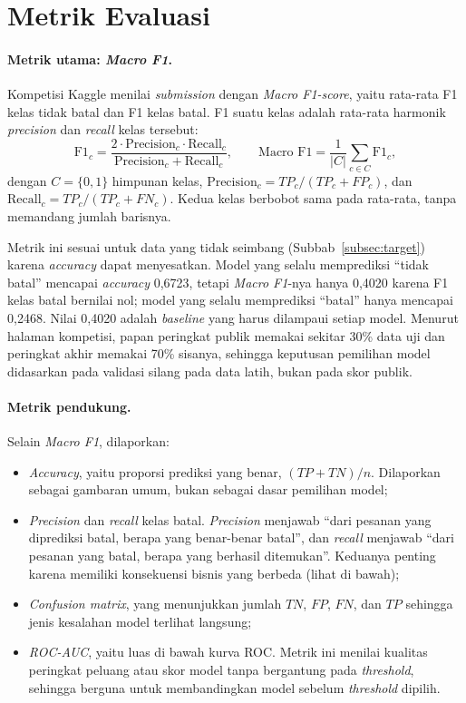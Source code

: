 \section{Metrik Evaluasi}
\label{sec:metrik}

\paragraph{Metrik utama: \textit{Macro F1}.} Kompetisi Kaggle menilai \textit{submission} dengan \textit{Macro F1-score}, yaitu rata-rata F1 kelas tidak batal dan F1 kelas batal. F1 suatu kelas adalah rata-rata harmonik \textit{precision} dan \textit{recall} kelas tersebut:
\begin{equation}
	\text{F1}_c = \frac{2 \cdot \text{Precision}_c \cdot \text{Recall}_c}{\text{Precision}_c + \text{Recall}_c},
	\qquad
	\text{Macro F1} = \frac{1}{|C|} \sum_{c \in C} \text{F1}_c,
	\label{eq:macro-f1}
\end{equation}
dengan $C = \{0, 1\}$ himpunan kelas, $\text{Precision}_c = TP_c / (TP_c + FP_c)$, dan $\text{Recall}_c = TP_c / (TP_c + FN_c)$. Kedua kelas berbobot sama pada rata-rata, tanpa memandang jumlah barisnya.

Metrik ini sesuai untuk data yang tidak seimbang (Subbab~\ref{subsec:target}) karena \textit{accuracy} dapat menyesatkan. Model yang selalu memprediksi ``tidak batal'' mencapai \textit{accuracy} 0,6723, tetapi \textit{Macro F1}-nya hanya 0,4020 karena F1 kelas batal bernilai nol; model yang selalu memprediksi ``batal'' hanya mencapai 0,2468. Nilai 0,4020 adalah \textit{baseline} yang harus dilampaui setiap model. Menurut halaman kompetisi, papan peringkat publik memakai sekitar 30\% data uji dan peringkat akhir memakai 70\% sisanya, sehingga keputusan pemilihan model didasarkan pada validasi silang pada data latih, bukan pada skor publik.

\paragraph{Metrik pendukung.} Selain \textit{Macro F1}, dilaporkan:
\begin{itemize}
	\item \textit{Accuracy}, yaitu proporsi prediksi yang benar, $(TP + TN) / n$. Dilaporkan sebagai gambaran umum, bukan sebagai dasar pemilihan model;
	\item \textit{Precision} dan \textit{recall} kelas batal. \textit{Precision} menjawab ``dari pesanan yang diprediksi batal, berapa yang benar-benar batal'', dan \textit{recall} menjawab ``dari pesanan yang batal, berapa yang berhasil ditemukan''. Keduanya penting karena memiliki konsekuensi bisnis yang berbeda (lihat di bawah);
	\item \textit{Confusion matrix}, yang menunjukkan jumlah $TN$, $FP$, $FN$, dan $TP$ sehingga jenis kesalahan model terlihat langsung;
	\item \textit{ROC-AUC}, yaitu luas di bawah kurva ROC. Metrik ini menilai kualitas peringkat peluang atau skor model tanpa bergantung pada \textit{threshold}, sehingga berguna untuk membandingkan model sebelum \textit{threshold} dipilih.
\end{itemize}

